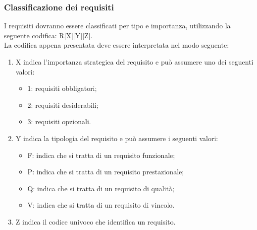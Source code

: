 		\subsubsection{Classificazione dei requisiti}
			I requisiti dovranno essere classificati per tipo e importanza, utilizzando la seguente codifica: R[X][Y][Z].\\
			La codifica appena presentata deve essere interpretata nel modo seguente:
			\begin{enumerate}
				\item X indica l'importanza strategica del requisito e può assumere uno dei seguenti valori:
				\begin{itemize}
					\item 1: requisiti obbligatori;
					\item 2: requisiti desiderabili;
					\item 3: requisiti opzionali.
				\end{itemize}
				\item Y indica la tipologia del requisito e può assumere i seguenti valori:
				\begin{itemize}
					\item F: indica che si tratta di un requisito funzionale;
					\item P: indica che si tratta di un requisito prestazionale;
					\item Q: indica che si tratta di un requisito di qualità;
					\item V: indica che si tratta di un requisito di vincolo.
				\end{itemize}
				\item Z indica il codice univoco che identifica un requisito.
			\end{enumerate}
